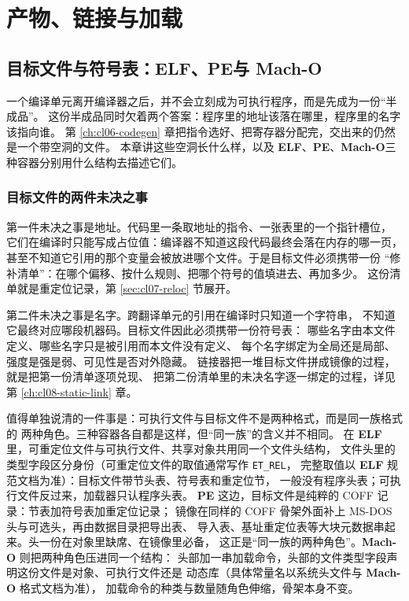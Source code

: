 \documentclass[12pt,a4paper,fontset=fandol]{ctexbook}
\newcommand{\Tp}[1]{\texttt{#1}}
\newcommand{\Elf}{\textbf{\textsf{ELF}}}
\newcommand{\PeFmt}{\textbf{\textsf{PE}}}
\newcommand{\Macho}{\textbf{\textsf{Mach-O}}}
\begin{document}
\part{产物、链接与加载}
\chapter{目标文件与符号表：\Elf、\PeFmt 与 \Macho}\label{ch:cl07-object}

一个编译单元离开编译器之后，并不会立刻成为可执行程序，而是先成为一份“半成品”。
这份半成品同时欠着两个答案：程序里的地址该落在哪里，程序里的名字该指向谁。
第 \ref{ch:cl06-codegen} 章把指令选好、把寄存器分配完，交出来的仍然是一个带空洞的文件。
本章讲这些空洞长什么样，以及 \Elf、\PeFmt、\Macho 三种容器分别用什么结构去描述它们。

\section{目标文件的两件未决之事}\label{sec:cl07-pending}

第一件未决之事是地址。代码里一条取地址的指令、一张表里的一个指针槽位，
它们在编译时只能写成占位值：编译器不知道这段代码最终会落在内存的哪一页，
甚至不知道它引用的那个变量会被放进哪个文件。于是目标文件必须携带一份
“修补清单”：在哪个偏移、按什么规则、把哪个符号的值填进去、再加多少。
这份清单就是重定位记录，第 \ref{sec:cl07-reloc} 节展开。

第二件未决之事是名字。跨翻译单元的引用在编译时只知道一个字符串，
不知道它最终对应哪段机器码。目标文件因此必须携带一份符号表：
哪些名字由本文件定义、哪些名字只是被引用而本文件没有定义、
每个名字绑定为全局还是局部、强度是强是弱、可见性是否对外隐藏。
链接器把一堆目标文件拼成镜像的过程，就是把第一份清单逐项兑现、
把第二份清单里的未决名字逐一绑定的过程，详见第 \ref{ch:cl08-static-link} 章。

值得单独说清的一件事是：可执行文件与目标文件不是两种格式，而是同一族格式的
两种角色。三种容器各自都是这样，但“同一族”的含义并不相同。
在 \Elf{} 里，可重定位文件与可执行文件、共享对象共用同一个文件头结构，
文件头里的类型字段区分身份（可重定位文件的取值通常写作 \Tp{ET\_REL}，
完整取值以 \Elf{} 规范文档为准）：目标文件带节头表、符号表和重定位节，
一般没有程序头表；可执行文件反过来，加载器只认程序头表。
\PeFmt{} 这边，目标文件是纯粹的 COFF 记录：节表加符号表加重定位记录；
镜像在同样的 COFF 骨架外面补上 MS-DOS 头与可选头，再由数据目录把导出表、
导入表、基址重定位表等大块元数据串起来。头一份在对象里缺席、在镜像里必备，
这正是“同一族的两种角色”。\Macho{} 则把两种角色压进同一个结构：
头部加一串加载命令，头部的文件类型字段声明这份文件是对象、可执行文件还是
动态库（具体常量名以系统头文件与 \Macho{} 格式文档为准），
加载命令的种类与数量随角色伸缩，骨架本身不变。
\end{document}
